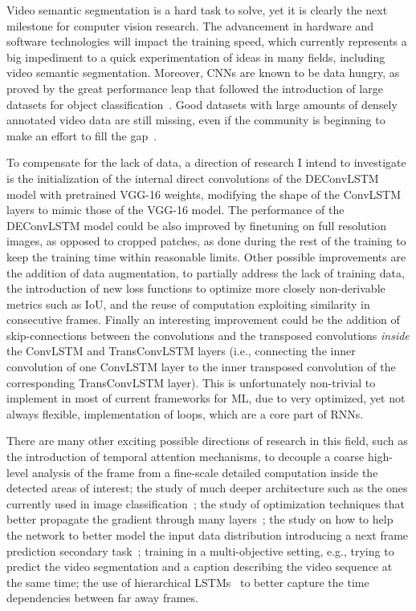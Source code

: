 Video semantic segmentation is a hard task to solve, yet it is clearly the next
milestone for computer vision research. The advancement in hardware and
software technologies will impact the training speed, which currently
represents a big impediment to a quick experimentation of ideas in many fields,
including video semantic segmentation. Moreover, CNNs are known to be data
hungry, as proved by the great performance leap that followed the introduction
of large datasets for object classification~\citep{ILSVRCarxiv14}. Good
datasets with large amounts of densely annotated video data are still missing,
even if the community is beginning to make an effort to fill the
gap~\citep[see~e.g.,~][]{Perazzi2016,lin2014microsoft}.

To compensate for the lack of data, a direction of research I intend to
investigate is the initialization of the internal direct convolutions of the
DEConvLSTM model with pretrained VGG-16 weights, modifying the shape of the
ConvLSTM layers to mimic those of the VGG-16 model. The performance of the
DEConvLSTM model could be also improved by finetuning on full resolution
images, as opposed to cropped patches, as done during the rest of the training
to keep the training time within reasonable limits. Other possible
improvements are the addition of data augmentation, to partially address the
lack of training data, the introduction of new loss functions to optimize more
closely non-derivable metrics such as IoU, and the reuse of computation
exploiting similarity in consecutive frames. Finally an interesting
improvement could be the addition of skip-connections between the convolutions
and the transposed convolutions \emph{inside} the ConvLSTM and TransConvLSTM
layers (i.e., connecting the inner convolution of one ConvLSTM layer to the
inner transposed convolution of the corresponding TransConvLSTM layer). This is
unfortunately non-trivial to implement in most of current frameworks for ML,
due to very optimized, yet not always flexible, implementation of loops, which
are a core part of RNNs.

There are many other exciting possible directions of research in this field,
such as the introduction of temporal attention mechanisms, to decouple a coarse
high-level analysis of the frame from a fine-scale detailed computation inside
the detected areas of interest; the study of much deeper architecture such as
the ones currently used in image classification~\citep[see, e.g.,~][]{%
szegedy2016inception,he2015deep}; the study of optimization techniques that
better propagate the gradient through many layers~\citep[see,
e.g.,~][]{he2015deep,huang2016deep,gulcehre2016mollifying}; the study on how to
help the network to better model the input data distribution introducing a next
frame prediction secondary task~\citep[see, e.g.,~][]{mahjourian2016geometry};
training in a multi-objective setting, e.g., trying to predict the video
segmentation and a caption describing the video sequence at the same time;
the use of hierarchical LSTMs~\citep[see, e.g.,~][]{Koutnik-et-al-ICML2014,
chung2016hierarchical} to better capture the time dependencies between far away
frames.
